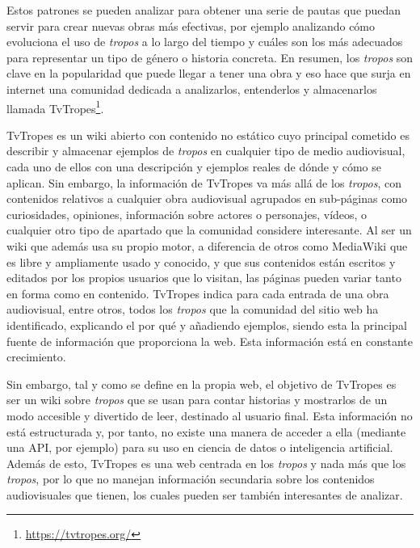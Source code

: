 Estos patrones se pueden analizar para obtener una serie de pautas que puedan
servir para crear nuevas obras más efectivas, por ejemplo analizando cómo
evoluciona el uso de \textit{tropos} a lo largo del tiempo y cuáles son los más
adecuados para representar un tipo de género o historia concreta. En resumen,
los \textit{tropos} son clave en la popularidad que puede llegar a tener una
obra y eso hace que surja en internet una comunidad dedicada a analizarlos,
entenderlos y almacenarlos llamada
TvTropes\footnote{\url{https://tvtropes.org/}}. 

TvTropes es un wiki abierto con contenido no estático cuyo principal cometido es
describir y almacenar ejemplos de \textit{tropos} en cualquier tipo de medio
audiovisual, cada uno de ellos con una descripción y ejemplos reales de dónde y
cómo se aplican. Sin embargo, la información de TvTropes va más allá de los
\textit{tropos}, con contenidos relativos a cualquier obra audiovisual agrupados
en sub-páginas como curiosidades, opiniones, información sobre actores o
personajes, vídeos, o cualquier otro tipo de apartado que la comunidad considere
interesante. Al ser un wiki que además usa su propio motor, a diferencia de
otros como MediaWiki que es libre y ampliamente usado y conocido, y que sus
contenidos están escritos y editados por los propios usuarios que lo visitan,
las páginas pueden variar tanto en forma como en contenido. TvTropes indica para
cada entrada de una obra audiovisual, entre otros, todos los \textit{tropos} que
la comunidad del sitio web ha identificado, explicando el por qué y añadiendo
ejemplos, siendo esta la principal fuente de información que proporciona la web.
Esta información está en constante crecimiento.

Sin embargo, tal y como se define en la propia web, el objetivo de TvTropes es
ser un wiki sobre \textit{tropos} que se usan para contar historias y mostrarlos
de un modo accesible y divertido de leer, destinado al usuario final. Esta
información no está estructurada y, por tanto, no existe una manera de acceder a
ella (mediante una API, por ejemplo) para su uso en ciencia de datos o
inteligencia artificial. Además de esto, TvTropes es una web centrada en los
\textit{tropos} y nada más que los \textit{tropos}, por lo que no manejan
información secundaria sobre los contenidos audiovisuales que tienen, los cuales
pueden ser también interesantes de analizar.

